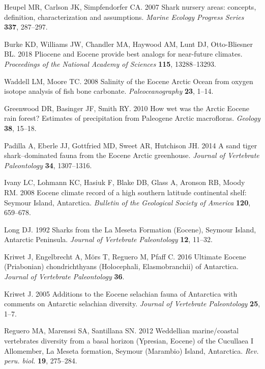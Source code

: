 \documentclass[]{rsos}%
\begin{document}
\begin{thebibliography}{99}
Heupel MR, Carlson JK, Simpfendorfer CA. 2007  Shark nursery areas: concepts,
  definition, characterization and assumptions. {\em Marine Ecology Progress
  Series} \textbf{337}, 287--297.

Burke KD, Williams JW, Chandler MA, Haywood AM, Lunt DJ, Otto-Bliesner BL. 2018
   Pliocene and Eocene provide best analogs for near-future climates. {\em
  Proceedings of the National Academy of Sciences} \textbf{115}, 13288--13293.

Waddell LM, Moore TC. 2008  {Salinity of the Eocene Arctic Ocean from oxygen
  isotope analysis of fish bone carbonate}. {\em Paleoceanography} \textbf{23},
  1--14.

Greenwood DR, Basinger JF, Smith RY. 2010  How wet was the Arctic Eocene rain
  forest? Estimates of precipitation from Paleogene Arctic macrofloras. {\em
  Geology} \textbf{38}, 15--18.

Padilla A, Eberle JJ, Gottfried MD, Sweet AR, Hutchison JH. 2014  A sand tiger
  shark--dominated fauna from the Eocene Arctic greenhouse. {\em Journal of
  Vertebrate Paleontology} \textbf{34}, 1307--1316.

Ivany LC, Lohmann KC, Hasiuk F, Blake DB, Glass A, Aronson RB, Moody RM. 2008
  {Eocene climate record of a high southern latitude continental shelf: Seymour
  Island, Antarctica}. {\em Bulletin of the Geological Society of America}
  \textbf{120}, 659--678.

Long DJ. 1992  {Sharks from the La Meseta Formation (Eocene), Seymour Island,
  Antarctic Peninsula}. {\em Journal of Vertebrate Paleontology} \textbf{12},
  11--32.

Kriwet J, Engelbrecht A, M{\"{o}}rs T, Reguero M, Pfaff C. 2016  {Ultimate
  Eocene (Priabonian) chondrichthyans (Holocephali, Elasmobranchii) of
  Antarctica}. {\em Journal of Vertebrate Paleontology} \textbf{36}.

Kriwet J. 2005  {Additions to the Eocene selachian fauna of Antarctica with
  comments on Antarctic selachian diversity}. {\em Journal of Vertebrate
  Paleontology} \textbf{25}, 1--7.

Reguero MA, Marenssi SA, Santillana SN. 2012  {Weddellian marine/coastal
  vertebrates diversity from a basal horizon (Ypresian, Eocene) of the
  Cucullaea I Allomember, La Meseta formation, Seymour (Marambio) Island,
  Antarctica}. {\em Rev. peru. biol.} \textbf{19}, 275--284.


\end{thebibliography}
\end{document}
